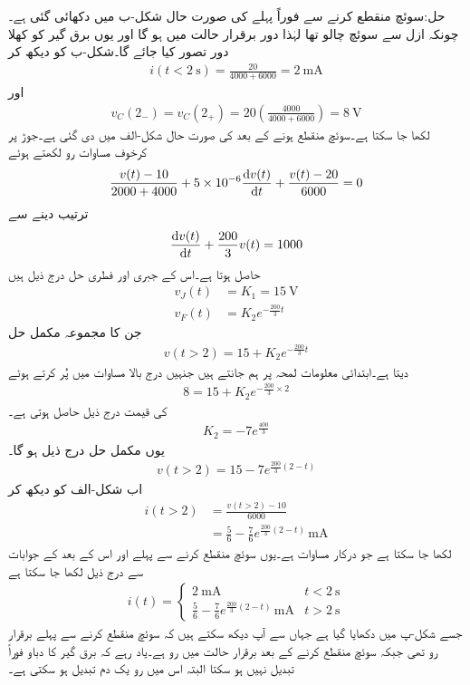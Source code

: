 حل:سوئچ منقطع کرنے سے فوراً پہلے کی صورت حال شکل-ب میں دکھائی گئی ہے۔چونکہ ازل سے سوئچ چالو تھا لہٰذا دور برقرار حالت میں ہو گا اور یوں برق گیر کو کھلا دور تصور کیا جائے گا۔شکل-ب کو دیکھ کر
\begin{align*}
i(t<\SI{2}{\second})=\frac{20}{4000+6000}=\SI{2}{\milli\ampere}
\end{align*}
اور
\begin{align*}
v_C(2_-)=v_C(2_+)=20\left(\frac{4000}{4000+6000}\right)=\SI{8}{\volt}
\end{align*}
لکھا جا سکتا ہے۔سوئچ منقطع ہونے کے بعد کی صورت حال شکل-الف میں دی گئی ہے۔جوڑ  پر کرخوف مساوات رو لکھتے ہوئے
\begin{align*}
\frac{v(t)-10}{2000+4000}+5\times 10^{-6}\frac{\dif v(t)}{\dif t}+\frac{v(t)-20}{6000}=0
\end{align*}
ترتیب دینے سے
\begin{align*}
\frac{\dif v(t)}{\dif t}+\frac{200}{3} v(t)=1000
\end{align*}
حاصل ہوتا ہے۔اس کے جبری اور فطری  حل درج ذیل ہیں
\begin{align*}
v_J(t)&=K_1=\SI{15}{\volt}\\
v_F(t)&=K_2e^{-\frac{200}{3}t}
\end{align*}
جن کا مجموعہ مکمل حل
\begin{align*}
v(t>2)=15+K_2e^{-\frac{200}{3}t}
\end{align*}
 دیتا ہے۔ابتدائی معلومات  لمحہ  پر ہم جانتے ہیں جنہیں درج بالا مساوات میں پُر کرتے ہوئے
\begin{align*}
8=15+K_2e^{-\frac{200}{3}\times 2}
\end{align*}
 کی قیمت درج ذیل حاصل ہوتی ہے۔
\begin{align*}
K_2=-7e^{\frac{400}{3}}
\end{align*}
یوں مکمل حل درج ذیل ہو گا۔
\begin{align*}
v(t>2)=15-7e^{\frac{200}{3}(2-t)}
\end{align*}
اب شکل-الف کو دیکھ کر
\begin{align*}
i(t>2)&=\frac{v(t>2)-10}{6000}\\
&=\frac{5}{6}-\frac{7}{6} e^{\frac{200}{3}(2-t)} \, \si{\milli\ampere}
\end{align*}
لکھا جا سکتا ہے جو درکار مساوات ہے۔یوں سوئچ منقطع کرنے سے پہلے اور اس کے بعد کے جوابات سے درج ذیل لکھا جا سکتا ہے
\begin{align*}
i(t)=
\begin{cases}
\SI{2}{\milli\ampere} & t<\SI{2}{\second}\\
\frac{5}{6}-\frac{7}{6} e^{\frac{200}{3}(2-t)} \, \si{\milli\ampere} & t>\SI{2}{\second}
\end{cases}
\end{align*}
جسے شکل-پ میں دکھایا گیا ہے جہاں سے آپ دیکھ سکتے ہیں کہ سوئچ منقطع کرنے سے پہلے برقرار رو  تھی جبکہ سوئچ منقطع کرنے کے بعد برقرار حالت  میں رو  ہے۔یاد رہے کہ برق گیر کا دباو فوراً تبدیل نہیں ہو سکتا البتہ اس میں رو یک دم تبدیل ہو سکتی ہے۔

